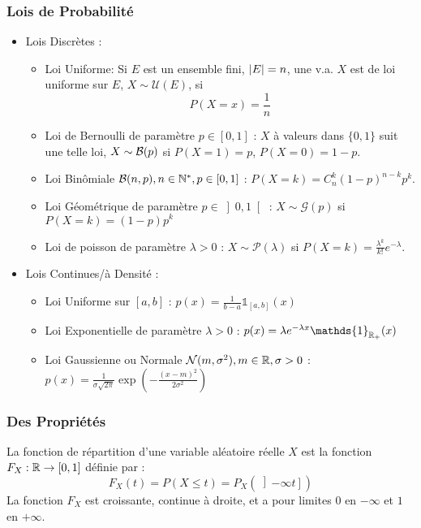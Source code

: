 \documentclass{cours}
\begin{document}
\subsubsection{Lois de Probabilité}
\begin{definition}
    \begin{itemize}
        \item Lois Discrètes :
              \begin{itemize}
                  \item Loi Uniforme: Si $E$ est un ensemble fini, $\left|E\right| = n$, une v.a. $X$ est de loi uniforme sur $E$, $X \sim \mathcal{U}(E)$, si \[P(X = x) = \frac{1}{n}\]
                  \item Loi de Bernoulli de paramètre $p \in \left[0, 1\right]$ : $X$ à valeurs dans $\{0, 1\}$ suit une telle loi, $X \sim \mathcal{B}(p)$ si $P(X = 1) = p$, $P(X = 0) = 1- p$.
                  \item Loi Binômiale $\mathcal{B}(n, p), n\in \mathbb{N}^{*}, p\in\left[0, 1\right]$ : $P(X = k) = C_{n}^{k}\left(1 - p\right)^{n - k}p^{k}$.
                  \item Loi Géométrique de paramètre $p \in \left]0, 1\right[$ : $X \sim \mathcal{G}(p)$ si $P(X = k) = \left(1 - p\right)p^{k}$
                  \item Loi de poisson de paramètre $\lambda > 0$ : $X \sim \mathcal{P}(\lambda)$ si $P(X = k) = \frac{\lambda^{k}}{k!}e^{-\lambda}$.
              \end{itemize}
        \item Lois Continues/à Densité :
              \begin{itemize}
                  \item Loi Uniforme sur $\left[a, b\right]$ : $p(x) = \frac{1}{b - a}\mathds{1}_{\left[a, b\right]}(x)$
                  \item Loi Exponentielle de paramètre $\lambda > 0$ : $p(x) = \lambda e^{-\lambda x}\mathds{1}_{\R_{+}}(x)$
                  \item Loi Gaussienne ou Normale $\mathcal{N}(m,\sigma^{2}), m \in \mathbb{R}, \sigma > 0$ : $p(x) = \frac{1}{\sigma\sqrt{2\pi}} \exp\left(- \frac{\left(x - m\right)^{2}}{2 \sigma^{2}}\right)$
              \end{itemize}
    \end{itemize}
\end{definition}

\subsubsection{Des Propriétés}
\begin{definition}
    La fonction de répartition d'une variable aléatoire réelle $X$ est la fonction $F_{X} : \mathbb{R} \rightarrow \left[0, 1\right]$ définie par :
    \[
        F_{X}(t) = P(X \leq t) = P_{X}\left(\left]- \infty t\right]\right)
    \]
    La fonction $F_{X}$ est croissante, continue à droite, et a pour limites $0$ en $-\infty$ et $1$ en $+\infty$.
\end{definition}
\end{document}

